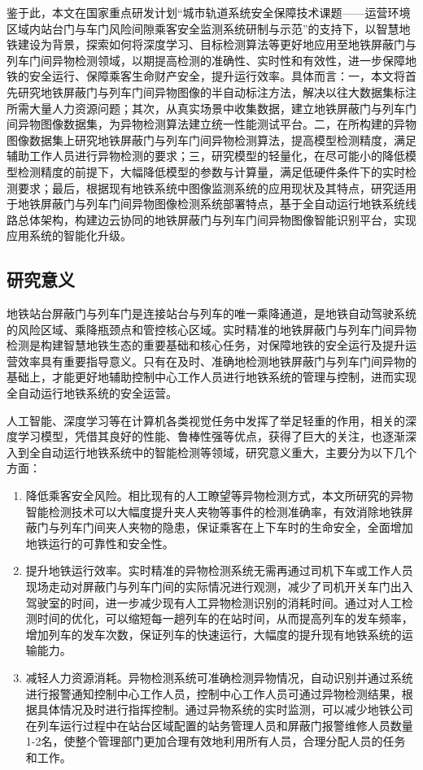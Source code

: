 鉴于此，本文在国家重点研发计划“城市轨道系统安全保障技术课题——运营环境区域内站台门与车门风险间隙乘客安全监测系统研制与示范”的支持下，以智慧地铁建设为背景，探索如何将深度学习、目标检测算法等更好地应用至地铁屏蔽门与列车门间异物检测领域，以期提高检测的准确性、实时性和有效性，进一步保障地铁的安全运行、保障乘客生命财产安全，提升运行效率。具体而言：一，本文将首先研究地铁屏蔽门与列车门间异物图像的半自动标注方法，解决以往大数据集标注所需大量人力资源问题；其次，从真实场景中收集数据，建立地铁屏蔽门与列车门间异物图像数据集，为异物检测算法建立统一性能测试平台。二，在所构建的异物图像数据集上研究地铁屏蔽门与列车门间异物检测算法，提高模型检测精度，满足辅助工作人员进行异物检测的要求；三，研究模型的轻量化，在尽可能小的降低模型检测精度的前提下，大幅降低模型的参数与计算量，满足低硬件条件下的实时检测要求；最后，根据现有地铁系统中图像监测系统的应用现状及其特点，研究适用于地铁屏蔽门与列车门间异物图像检测系统部署特点，基于全自动运行地铁系统线路总体架构，构建边云协同的地铁屏蔽门与列车门间异物图像智能识别平台，实现应用系统的智能化升级。
\subsection{研究意义}
地铁站台屏蔽门与列车门是连接站台与列车的唯一乘降通道，是地铁自动驾驶系统的风险区域、乘降瓶颈点和管控核心区域。实时精准的地铁屏蔽门与列车门间异物检测是构建智慧地铁生态的重要基础和核心任务，对保障地铁的安全运行及提升运营效率具有重要指导意义。只有在及时、准确地检测地铁屏蔽门与列车门间异物的基础上，才能更好地辅助控制中心工作人员进行地铁系统的管理与控制，进而实现全自动运行地铁系统的安全运营。

人工智能、深度学习等在计算机各类视觉任务中发挥了举足轻重的作用，相关的深度学习模型，凭借其良好的性能、鲁棒性强等优点，获得了巨大的关注，也逐渐深入到全自动运行地铁系统中的智能检测等领域，研究意义重大，主要分为以下几个方面：
\begin{enumerate}[topsep = 0 pt, itemsep= 0 pt, parsep=0pt, partopsep=0pt, leftmargin=44pt, itemindent=0pt, labelsep=6pt, label=(\arabic*)]
	\item 降低乘客安全风险。相比现有的人工瞭望等异物检测方式，本文所研究的异物智能检测技术可以大幅度提升夹人夹物等事件的检测准确率，有效消除地铁屏蔽门与列车门间夹人夹物的隐患，保证乘客在上下车时的生命安全，全面增加地铁运行的可靠性和安全性。
	
	\item 提升地铁运行效率。实时精准的异物检测系统无需再通过司机下车或工作人员现场走动对屏蔽门与列车门间的实际情况进行观测，减少了司机开关车门出入驾驶室的时间，进一步减少现有人工异物检测识别的消耗时间。通过对人工检测时间的优化，可以缩短每一趟列车的在站时间，从而提高列车的发车频率，增加列车的发车次数，保证列车的快速运行，大幅度的提升现有地铁系统的运输能力。
	
	\item 减轻人力资源消耗。异物检测系统可准确检测异物情况，自动识别并通过系统进行报警通知控制中心工作人员，控制中心工作人员可通过异物检测结果，根据具体情况及时进行指挥控制。通过异物系统的实时监测，可以减少地铁公司在列车运行过程中在站台区域配置的站务管理人员和屏蔽门报警维修人员数量1-2名，使整个管理部门更加合理有效地利用所有人员，合理分配人员的任务和工作。
\end{enumerate}
